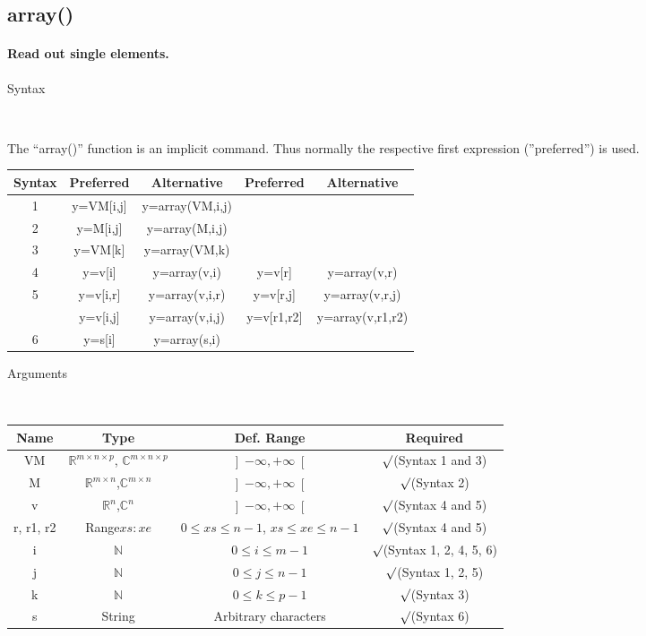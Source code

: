 \newpage
\subsection*{\hypertarget{array}{}{\Large array()}}


\paragraph{\textmd{\label{par:array}}Read out single elements.}

\begin{description}
\item [Syntax]~
\end{description}
The {}``array()'' function is an implicit command. Thus normally
the respective first expression (''preferred'') is used.

\begin{tabular}{|c||c|c||c|c|}
\hline 
Syntax&
Preferred&
Alternative&
Preferred&
Alternative\tabularnewline
\hline
\hline 
1&
y=VM{[}i,j{]}&
y=array(VM,i,j)&
&
\tabularnewline
\hline 
2&
y=M{[}i,j{]}&
y=array(M,i,j)&
&
\tabularnewline
\hline 
3&
y=VM{[}k{]}&
y=array(VM,k)&
&
\tabularnewline
\hline 
4&
y=v{[}i{]}&
y=array(v,i)&
y=v{[}r{]}&
y=array(v,r)\tabularnewline
\hline 
5&
y=v{[}i,r{]}&
y=array(v,i,r)&
y=v{[}r,j{]}&
y=array(v,r,j)\tabularnewline
\hline 
&
y=v{[}i,j{]}&
y=array(v,i,j)&
y=v{[}r1,r2{]}&
y=array(v,r1,r2)\tabularnewline
\hline 
6&
y=s{[}i{]}&
y=array(s,i)&
&
\tabularnewline
\hline
\end{tabular}

\begin{description}
\item [Arguments]~
\end{description}
\begin{tabular}{|c|c|c|c|}
\hline 
Name&
Type&
Def. Range&
Required\tabularnewline
\hline
\hline 
VM&
$\mathbb{\mathbb{R}}^{m\times n\times p}$, $\mathbb{\mathbb{C}}^{m\times n\times p}$&
$\left]-\infty,+\infty\right[$&
$\surd$(Syntax 1 and 3)\tabularnewline
\hline
M&
$\mathbb{\mathbb{R}}^{m\times n}$,$\mathbb{\mathbb{C}}^{m\times n}$&
$\left]-\infty,+\infty\right[$&
$\surd$(Syntax 2)\tabularnewline
\hline
v&
$\mathbb{\mathbb{R}}^{n}$,$\mathbb{\mathbb{C}}^{n}$ &
$\left]-\infty,+\infty\right[$&
$\surd$(Syntax 4 and 5)\tabularnewline
\hline
r, r1, r2&
Range$xs:xe$&
$0\leq xs\leq n-1$, $xs\leq xe\leq n-1$&
$\surd$(Syntax 4 and 5)\tabularnewline
\hline
i&
$\mathbb{N}$&
$0\leq i\leq m-1$&
$\surd$(Syntax 1, 2, 4, 5, 6)\tabularnewline
\hline
j&
$\mathbb{N}$&
$0\leq j\leq n-1$&
$\surd$(Syntax 1, 2, 5)\tabularnewline
\hline
k&
$\mathbb{N}$&
$0\leq k\leq p-1$&
$\surd$(Syntax 3)\tabularnewline
\hline
s&
String&
Arbitrary characters&
$\surd$(Syntax 6)\tabularnewline
\hline
\end{tabular}

